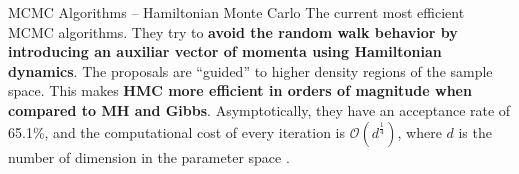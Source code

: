 \begin{frame}{MCMC Algorithms -- Hamiltonian Monte Carlo}
	The current most efficient MCMC algorithms.
	They try to \textbf{avoid the random walk behavior by introducing an auxiliar vector of momenta
	using Hamiltonian dynamics}.
	The proposals are ``guided'' to higher density regions of the sample space.
	This makes \textbf{HMC more efficient in orders of magnitude when compared to MH and Gibbs}.
	\vfill
	Asymptotically, they have an acceptance rate of 65.1\%,
	and the computational cost of every iteration is $\mathcal{O}(d^{\frac{1}{4}})$,
	where $d$ is the number of dimension in the parameter space \parencite{beskosOptimalTuningHybrid2013}.
\end{frame}


